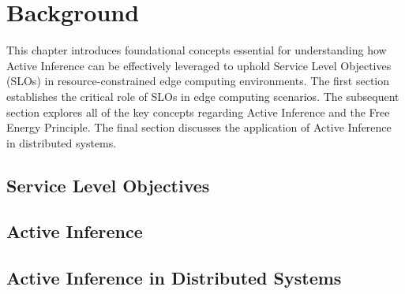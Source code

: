 \chapter{Background}
This chapter introduces foundational concepts essential for understanding how Active Inference
can be effectively leveraged to uphold Service Level Objectives (SLOs) in resource-constrained
edge computing environments. The first section establishes the critical role of SLOs in edge computing scenarios. The subsequent section explores all of the key concepts regarding Active Inference and the Free Energy Principle. The final section discusses the application of Active Inference in distributed systems.

\section{Service Level Objectives}
\section{Active Inference}
\section{Active Inference in Distributed Systems}

